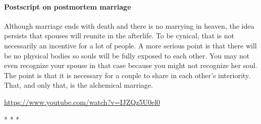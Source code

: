 \paragraph{Postscript on postmortem marriage}
Although marriage ends with death and there is no marrying in heaven, the idea persists that spouses will reunite in the afterlife. To be cynical, that is not necessarily an incentive for a lot of people. A more serious point is that there will be no physical bodies so souls will be fully exposed to each other. You may not even recognize your spouse in that case because you might not recognize her soul. The point is that it is necessary for a couple to share in each other's interiority. That, and only that, is the alchemical marriage.

\url{https://www.youtube.com/watch?v=IJZQz5U0el0}




\begin{center}* * *\end{center}


